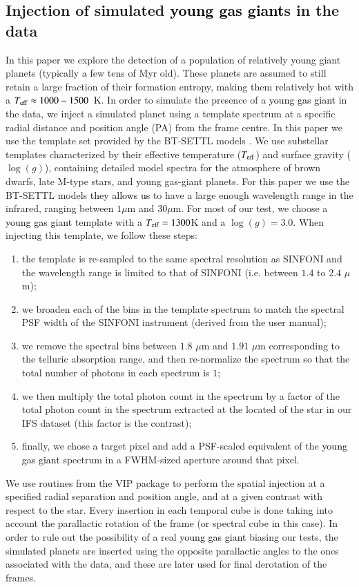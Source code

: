 \documentclass{aa}
\newcommand{\newchange}[1]{\textcolor{black}{#1}}
\begin{document}
\subsection{Injection of simulated \newchange{young gas giant}s in the data}\label{sec: FC insertion}

In this paper we explore the detection of a population of relatively young giant planets (typically a few tens of Myr old). These planets are assumed to still retain a large fraction of their formation entropy, making them relatively hot with a $T_{\rm eff}\approx 1000 - 1500$~K.
In order to simulate the presence of a \newchange{young gas giant} in the data, we inject a simulated planet using a template spectrum at a specific radial distance and position angle (PA) from the frame centre.
In this paper we use the template set provided by the BT-SETTL models \citep{1997Allard, 2011Allard,2003BTsettl}.%
We use substellar templates characterized by their effective temperature ($T_{\rm{eff}}$) and surface gravity ($\log(g)$), containing detailed model spectra for the atmosphere of brown dwarfs, late M-type stars, and young gas-giant planets.
For this paper we use the BT-SETTL models \newchange{they allows us} to have a large enough wavelength range in the infrared, ranging between $1\mu$m and $30\mu$m.
For most of our test, we choose a \newchange{young gas giant} template with a $T_{\rm eff} = 1300$K and a $\log(g)=3.0$.
When injecting this template, we follow these steps:
\begin{enumerate}
    \item the template is re-sampled to the same spectral resolution as SINFONI and the wavelength range is limited to that of SINFONI (i.e. between $1.4$ to $2.4$ $\mu$m);
    \item we broaden each of the bins in the template spectrum to match the spectral PSF width of the SINFONI instrument (derived from the user manual);
    \item we remove the spectral bins between $1.8$ $\mu$m and $1.91$ $\mu$m corresponding to the telluric absorption range, and then re-normalize the spectrum so that the total number of photons in each spectrum is $1$;
    \item we then multiply the total photon count in the spectrum by a factor of the total photon count in the spectrum extracted at the located of the star in our IFS dataset (this factor is the contrast);
    \item finally, we chose a target pixel and add a PSF-scaled equivalent of the \newchange{young gas giant} spectrum in a FWHM-sized aperture around that pixel.
\end{enumerate}
We use routines from the \textsc{VIP} package to perform the spatial injection at a specified radial separation and position angle, and at a given contrast with respect to the star.
Every insertion in each temporal cube is done taking into account the parallactic rotation of the frame (or spectral cube in this case).
In order to rule out the possibility of a real \newchange{young gas giant} biasing our tests, the simulated planets are inserted using the opposite parallactic angles to the ones associated with the data, and these are later used for final derotation of the frames.
\end{document}
